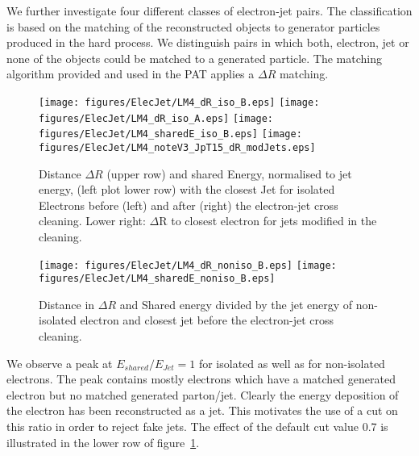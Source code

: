 \documentclass{cmspaper}
\begin{document}
We further investigate four different classes of electron-jet pairs. The
classification is based on the matching of the reconstructed objects
to generator particles produced in the hard process. We distinguish pairs in
which both, electron, jet or none of the objects could be matched to a generated
particle. The matching algorithm provided and used in the PAT applies a $\Delta
R$ matching.

\begin{figure}[hb]
\begin{center}
    \texttt{[image: figures/ElecJet/LM4\_dR\_iso\_B.eps]}
    \texttt{[image: figures/ElecJet/LM4\_dR\_iso\_A.eps]}
    \texttt{[image: figures/ElecJet/LM4\_sharedE\_iso\_B.eps]}
    \texttt{[image: figures/ElecJet/LM4\_noteV3\_JpT15\_dR\_modJets.eps]}
    \caption{Distance \(\Delta R\) (upper row) and shared Energy, normalised to jet energy, (left plot lower row) with the closest Jet for isolated Electrons before (left) and after (right) the electron-jet cross cleaning. Lower right: $\Delta$R to closest electron for jets modified in the cleaning.}
\label{fig:dR_sE_ElecJet_iso}
\end{center}
\end{figure}

\begin{figure}[hb]
\begin{center}
    \texttt{[image: figures/ElecJet/LM4\_dR\_noniso\_B.eps]}
    \texttt{[image: figures/ElecJet/LM4\_sharedE\_noniso\_B.eps]}
    \caption{Distance in $\Delta R$ and Shared energy divided by the jet energy
    of non-isolated electron and closest jet before the electron-jet cross cleaning.}
\label{fig:dR_sE_ElecJet_noniso}
\end{center}
\end{figure}

We observe a peak at $E_{shared}/E_{Jet}=1$ for isolated as well as for
non-isolated electrons. The peak contains mostly electrons which have a matched
generated electron but no matched generated parton/jet. Clearly the energy
deposition of the electron has been reconstructed as a jet. This motivates the
use of a cut on this ratio in order to reject fake jets. The effect of the
default cut value 0.7 is illustrated in the lower row of
figure~\ref{fig:dR_sE_ElecJet_iso}.
\end{document}
